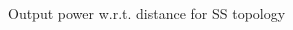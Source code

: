 \begin{figure}[h]
\centering
\begin{subfigmatrix}{2} 
\end{subfigmatrix}
\end{figure}
\begin{figure}[H]
\centering
\begin{subfigmatrix}{1} 
\end{subfigmatrix}
\caption{Output power w.r.t. distance for SS topology}
\end{figure}

